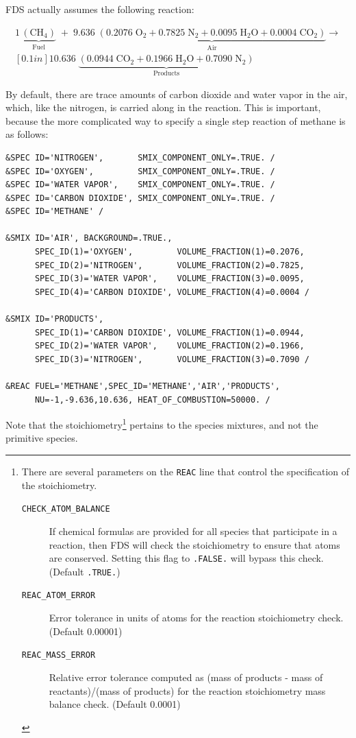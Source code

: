 \documentclass[11pt]{book}
\newcommand{\ct}{\tt\small}
\begin{document}
\noindent FDS actually assumes the following reaction:

\begin{eqnarray}
1\,\underbrace{\mathrm{ (CH_4) }}_\text{Fuel} \; + \;
9.636 \; \underbrace{ \mathrm{\left( 0.2076 \; O_2 + 0.7825 \; N_2 + 0.0095 \; H_2O + 0.0004 \; CO_2 \right)}}_\text{Air} \rightarrow \\ [0.1in]
\nonumber 10.636 \; \underbrace{\mathrm{(0.0944 \; CO_2 +  0.1966 \; H_2O + 0.7090 \; N_2)}}_\text{Products}
\end{eqnarray}

\noindent By default, there are trace amounts of carbon dioxide and water vapor in the air, which, like the nitrogen, is carried along in the reaction. This is important, because the more complicated way to specify a single step reaction of methane is as follows:

\footnotesize
\begin{verbatim}
&SPEC ID='NITROGEN',       SMIX_COMPONENT_ONLY=.TRUE. /
&SPEC ID='OXYGEN',         SMIX_COMPONENT_ONLY=.TRUE. /
&SPEC ID='WATER VAPOR',    SMIX_COMPONENT_ONLY=.TRUE. /
&SPEC ID='CARBON DIOXIDE', SMIX_COMPONENT_ONLY=.TRUE. /
&SPEC ID='METHANE' /

&SMIX ID='AIR', BACKGROUND=.TRUE.,
      SPEC_ID(1)='OXYGEN',         VOLUME_FRACTION(1)=0.2076,
      SPEC_ID(2)='NITROGEN',       VOLUME_FRACTION(2)=0.7825,
      SPEC_ID(3)='WATER VAPOR',    VOLUME_FRACTION(3)=0.0095,
      SPEC_ID(4)='CARBON DIOXIDE', VOLUME_FRACTION(4)=0.0004 /

&SMIX ID='PRODUCTS',
      SPEC_ID(1)='CARBON DIOXIDE', VOLUME_FRACTION(1)=0.0944,
      SPEC_ID(2)='WATER VAPOR',    VOLUME_FRACTION(2)=0.1966,
      SPEC_ID(3)='NITROGEN',       VOLUME_FRACTION(3)=0.7090 /

&REAC FUEL='METHANE',SPEC_ID='METHANE','AIR','PRODUCTS',
      NU=-1,-9.636,10.636, HEAT_OF_COMBUSTION=50000. /
\end{verbatim} \normalsize

\noindent
Note that the stoichiometry\footnote{There are several parameters on the {\ct REAC} line that control the specification of the stoichiometry.
\begin{description}
\item[{\ct CHECK\_ATOM\_BALANCE}] If chemical formulas are provided for all species that participate in a reaction, then FDS will
check the stoichiometry to ensure that atoms are conserved.  Setting this flag to {\ct .FALSE.} will bypass this check.  (Default {\ct .TRUE.})
\item[{\ct REAC\_ATOM\_ERROR}] Error tolerance in units of atoms for the reaction stoichiometry check.  (Default 0.00001)
\item[{\ct REAC\_MASS\_ERROR}] Relative error tolerance computed as (mass of products - mass of reactants)/(mass of products)
for the reaction stoichiometry mass balance check.  (Default 0.0001)
\end{description}} pertains to the species mixtures, and not the primitive species.
\end{document}
